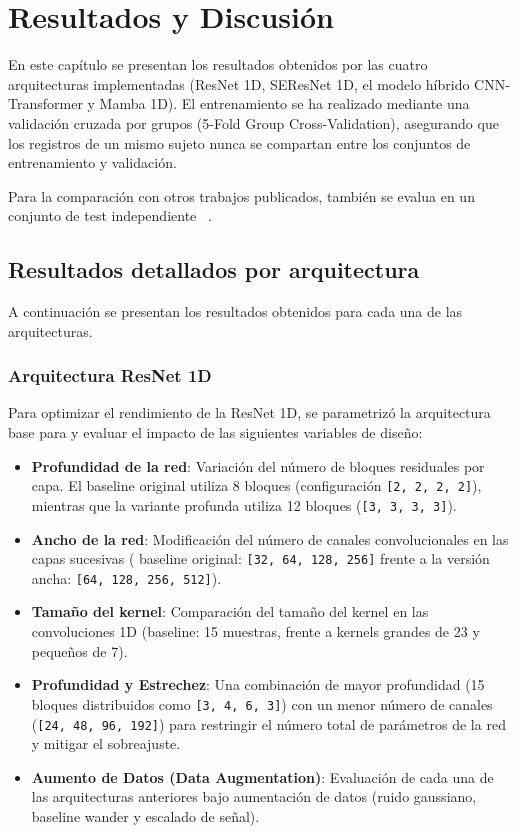 
\chapter{Resultados y Discusión}
\label{chap:resultados}

En este capítulo se presentan los resultados obtenidos por las cuatro
arquitecturas implementadas (ResNet 1D, SEResNet 1D, el modelo
híbrido CNN-Transformer y Mamba 1D). El entrenamiento se ha realizado mediante
una validación cruzada por grupos (5-Fold Group Cross-Validation),
asegurando que los registros de un mismo sujeto
nunca se compartan entre los conjuntos de entrenamiento y validación. 

Para la comparación con otros trabajos publicados, también se evalua en un conjunto
de test independiente ~\cite{moody_paf_2001}.

\section{Resultados detallados por arquitectura}
\label{sec:resultados_por_arquitectura}

A continuación se presentan los resultados obtenidos para cada una de las arquitecturas.

\subsection{Arquitectura ResNet 1D}
\label{subsec:resultados_resnet}

Para optimizar el rendimiento de la ResNet 1D,
se parametrizó la arquitectura base para y evaluar el impacto
de las siguientes variables de diseño:
\begin{itemize}
    \item \textbf{Profundidad de la red}: Variación del número de bloques residuales por capa.
    El baseline original utiliza 8 bloques (configuración \texttt{[2, 2, 2, 2]}), mientras que la variante
    profunda utiliza 12 bloques (\texttt{[3, 3, 3, 3]}).
    \item \textbf{Ancho de la red}: Modificación del número de canales convolucionales en las capas sucesivas ( baseline original: \texttt{[32, 64, 128, 256]} frente a la versión ancha: \texttt{[64, 128, 256, 512]}).
    \item \textbf{Tamaño del kernel}: Comparación del tamaño del kernel en las convoluciones 1D (baseline: 15 muestras, frente a kernels grandes de 23 y pequeños de 7).
    \item \textbf{Profundidad y Estrechez}: Una combinación de mayor profundidad (15 bloques distribuidos como \texttt{[3, 4, 6, 3]}) con un menor número de canales (\texttt{[24, 48, 96, 192]}) para restringir el número total de parámetros de la red y mitigar el sobreajuste.
    \item \textbf{Aumento de Datos (Data Augmentation)}: Evaluación de cada una de las arquitecturas anteriores bajo aumentación de datos (ruido gaussiano, baseline wander y escalado de señal).
\end{itemize}

